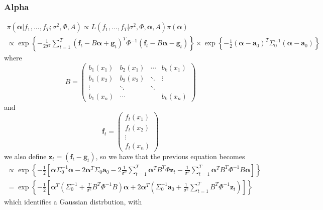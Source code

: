 \subsubsection{Alpha}
\begin{gather*}
    \pi(\boldsymbol{\alpha} | f_1, ..., f_T ; \sigma^2, \Phi, A) \propto L(f_1, ..., f_T | \sigma^2, \Phi, \boldsymbol{\alpha}, A) \pi(\boldsymbol{\alpha}) \\
    \propto \exp \left\{- \frac{1}{2 \sigma^2} \sum_{t=1}^T(\textbf{f}_t - B\boldsymbol{\alpha} + \textbf{g}_t)^T \Phi^{-1}(\textbf{f}_t - B\boldsymbol{\alpha} - \textbf{g}_t)\right\} \times
    \exp \left \{- \frac{1}{2} (\boldsymbol{\alpha} - \textbf{a}_0)^T \Sigma_0^{-1} (\boldsymbol{\alpha} - \textbf{a}_0)       \right\}
\end{gather*}
where 
\[
        B =
        \begin{pmatrix}
        b_1(x_1) & b_2(x_1)              & \cdots & b_k(x_1) \\
        b_1(x_2)              & b_2(x_2) & \ddots & \vdots \\
        \vdots         & \ddots          & \ddots &  \\
        b_1(x_n)              & \cdots          &      &  b_k(x_n)
        \end{pmatrix}
        \]
and 
\[
\textbf{f}_t = 
\begin{pmatrix}
    f_t(x_1) \\
    f_t(x_2) \\
    \vdots \\
    f_t(x_n)
\end{pmatrix}
\]
we also define $\textbf{z}_t = (\textbf{f}_t - \textbf{g}_t)$, so we have that the previous equation becomes 
\begin{gather*}
    \propto \exp \left \{- \frac{1}{2} \left[\boldsymbol{\alpha} \Sigma_0^{-1}\boldsymbol{\alpha} - 2 \boldsymbol{\alpha}^T \Sigma_0 \textbf{a}_0 - 2 \frac{1}{\sigma^2} \sum_{t=1}^T \boldsymbol{\alpha}^TB^T \Phi \textbf{z}_t - \frac{1}{\sigma^2 } \sum_{t=1}^T \boldsymbol{\alpha}^TB^T \Phi^{-1}B \boldsymbol{\alpha} \right] \right \} \\
    = \exp \left \{-\frac{1}{2} \left [ \boldsymbol{\alpha}^T \left( \Sigma_0^{-1} + \frac{T}{\sigma^2}B^T \Phi^{-1}B \right)\boldsymbol{\alpha} + 2\boldsymbol{\alpha}^T \left( \Sigma_0^{-1}\textbf{a}_0 + \frac{1}{\sigma^2} \sum_{t=1}^T B^T \Phi^{-1}\textbf{z}_t \right) \right] \right \}
\end{gather*}
which identifies a Gaussian distrbution, with

